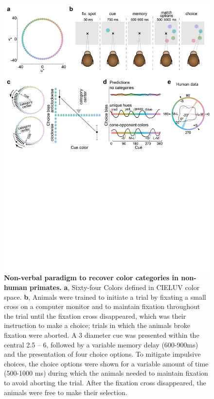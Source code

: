 \documentclass[9pt,biorxiv,lineno,onehalfspacing]{lapreprint}
\begin{document}
\begin{refsection}
\begin{figure}
    \begin{fullwidth}
    \centering
    \includegraphics[width=\textwidth+4cm,trim={0 12.5cm 0 0},clip]{F1_ParadigmPredictions_9.pdf}
    \caption{\textbf{Non-verbal paradigm to recover color categories in non-human primates.}
    \textbf{a}, Sixty-four Colors defined in CIELUV color space. 
	\textbf{b}, Animals were trained to initiate a trial by fixating a small cross on a computer monitor and to maintain fixation throughout the trial until the fixation cross disappeared, which was their instruction to make a choice; trials in which the animals broke fixation were aborted. 
	A 3\degree{} diameter cue was presented within the central 2.5 – 6\degree{}, followed by a variable memory delay (600-900ms) and the presentation of four choice options. 
	To mitigate impulsive choices, the choice options were shown for a variable amount of time (500-1000 ms) during which the animals needed to maintain fixation to avoid aborting the trial. 
    After the fixation cross disappeared, the animals were free to make their selection. 
}
\end{fullwidth}
\end{figure}
\end{refsection}
\end{document}
